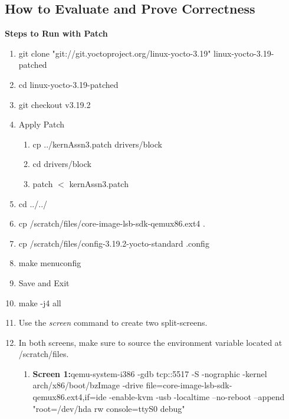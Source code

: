 \documentclass[draftclsnofoot, onecolumn, 10pt, compsoc]{IEEEtran}
\begin{document}
		\subsection{How to Evaluate and Prove Correctness}
			\textbf{Steps to Run with Patch}
			\begin{enumerate}
				\item git clone "git://git.yoctoproject.org/linux-yocto-3.19" linux-yocto-3.19-patched
				
				\item cd linux-yocto-3.19-patched
				
				\item git checkout v3.19.2
				
				\item Apply Patch
				\begin{enumerate}
					\item cp ../kernAssn3.patch drivers/block
				
					\item cd drivers/block
				
					\item patch $<$ kernAssn3.patch
				\end{enumerate}
				\item cd ../../
				
				\item cp /scratch/files/core-image-lsb-sdk-qemux86.ext4 .
				
				\item cp /scratch/files/config-3.19.2-yocto-standard .config
				
				\item make menuconfig
				
				\item Save and Exit
				
				\item make -j4 all
				
				\item Use the \textit{screen} command to create two split-screens.
				
				\item In both screens, make sure to source the environment variable located at /scratch/files.
				\begin{enumerate}
					\item{\textbf{Screen 1:}qemu-system-i386 -gdb tcp::5517 -S -nographic -kernel arch/x86/boot/bzImage -drive file=core-image-lsb-sdk-qemux86.ext4,if=ide -enable-kvm -usb -localtime --no-reboot --append "root=/dev/hda rw console=ttyS0 debug"}
					

\end{enumerate}
\end{enumerate}
\end{document}
